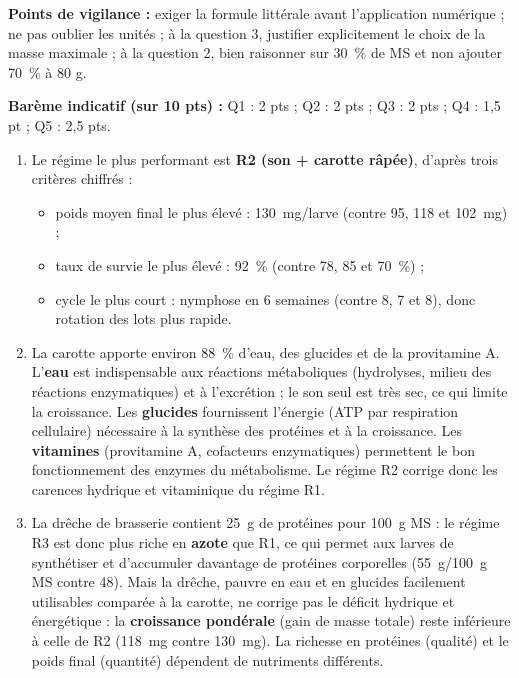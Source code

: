 \documentclass[11pt]{article}
\begin{document}
\begin{corrige}
\begin{enumerate}
\end{enumerate}
\textbf{Points de vigilance :} exiger la formule littérale avant l'application numérique ; ne pas oublier les unités ; à la question 3, justifier explicitement le choix de la masse maximale ; à la question 2, bien raisonner sur \SI{30}{\percent} de MS et non ajouter \SI{70}{\percent} à 80 g.
\end{corrige}

\begin{corrige}
\textbf{Barème indicatif (sur 10 pts) :} Q1 : 2 pts ; Q2 : 2 pts ; Q3 : 2 pts ; Q4 : 1,5 pt ; Q5 : 2,5 pts.

\begin{enumerate}
\item Le régime le plus performant est \textbf{R2 (son + carotte râpée)}, d'après trois critères chiffrés :
\begin{itemize}
\item poids moyen final le plus élevé : \SI{130}{mg/larve} (contre 95, 118 et \SI{102}{mg}) ;
\item taux de survie le plus élevé : \SI{92}{\percent} (contre 78, 85 et \SI{70}{\percent}) ;
\item cycle le plus court : nymphose en 6 semaines (contre 8, 7 et 8), donc rotation des lots plus rapide.
\end{itemize}
\item La carotte apporte environ \SI{88}{\percent} d'eau, des glucides et de la provitamine A. L'\textbf{eau} est indispensable aux réactions métaboliques (hydrolyses, milieu des réactions enzymatiques) et à l'excrétion ; le son seul est très sec, ce qui limite la croissance. Les \textbf{glucides} fournissent l'énergie (ATP par respiration cellulaire) nécessaire à la synthèse des protéines et à la croissance. Les \textbf{vitamines} (provitamine A, cofacteurs enzymatiques) permettent le bon fonctionnement des enzymes du métabolisme. Le régime R2 corrige donc les carences hydrique et vitaminique du régime R1.
\item La drêche de brasserie contient \SI{25}{g} de protéines pour \SI{100}{g} MS : le régime R3 est donc plus riche en \textbf{azote} que R1, ce qui permet aux larves de synthétiser et d'accumuler davantage de protéines corporelles (\SI{55}{g/100 g} MS contre 48). Mais la drêche, pauvre en eau et en glucides facilement utilisables comparée à la carotte, ne corrige pas le déficit hydrique et énergétique : la \textbf{croissance pondérale} (gain de masse totale) reste inférieure à celle de R2 (\SI{118}{mg} contre \SI{130}{mg}). La richesse en protéines (qualité) et le poids final (quantité) dépendent de nutriments différents.

\end{enumerate}
\end{corrige}
\end{document}
